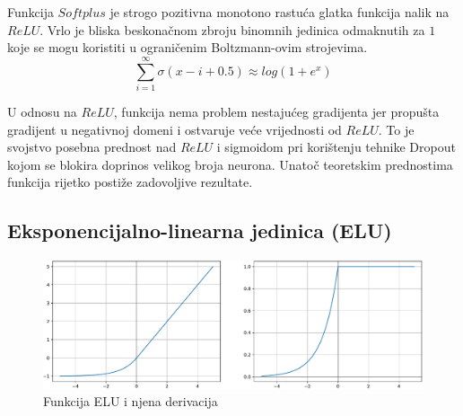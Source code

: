 \documentclass[times, utf8, numeric, diplomski]{fer}
\def\TODO#1{\noindent\textcolor{red}{TODO: \textit{#1}}\newline}
\def\todo#1{\TODO{#1}}
\def\todoimg#1{\begin{center} \textcolor{red}{\big[ IMAGE: \textit{#1} \big]} \end{center}}
\begin{document}
Funkcija $Softplus$ je strogo pozitivna monotono rastuća glatka funkcija nalik na $ReLU$. Vrlo je bliska beskonačnom zbroju binomnih jedinica odmaknutih za $1$ koje se mogu koristiti u ograničenim Boltzmann-ovim strojevima. \citep{relu_rbm}
\begin{equation}
\sum_{i=1}^{\infty}\sigma(x-i+0.5) \approx log(1+e^x)
\end{equation}

U odnosu na $ReLU$, funkcija nema problem nestajućeg gradijenta jer propušta gradijent u negativnoj domeni i ostvaruje veće vrijednosti od $ReLU$. To je svojstvo posebna prednost nad $ReLU$ i sigmoidom pri korištenju tehnike Dropout kojom se blokira doprinos velikog broja neurona. Unatoč teoretskim prednostima funkcija rijetko postiže zadovoljive rezultate. \citep{softplus}


%

\subsection{Eksponencijalno-linearna jedinica (ELU)}
\label{func:elu}

\begin{figure}[H]
\includegraphics[width=\textwidth]{func_ELU.pdf}
\centering
\caption{Funkcija ELU i njena derivacija}
\label{fig:elu}
\end{figure}
\end{document}
